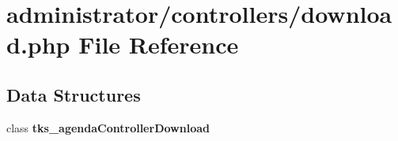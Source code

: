 \section{administrator/controllers/download.php File Reference}
\label{administrator_2controllers_2download_8php}
\subsection*{Data Structures}
\begin{DoxyCompactItemize}
\item 
class \textbf{ tks\+\_\+agenda\+Controller\+Download}
\end{DoxyCompactItemize}
